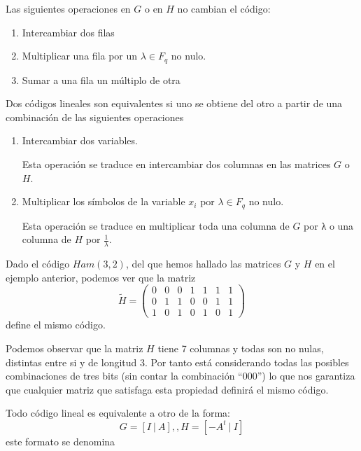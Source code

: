 \obs Las siguientes operaciones en $G$ o en $H$ no cambian el código:
\begin{enumerate}
\item Intercambiar dos filas
\item Multiplicar una fila por un $λ\in F_q$ no nulo.
\item Sumar a una fila un múltiplo de otra
\end{enumerate}

\begin{defn}
Dos códigos lineales son equivalentes si uno se obtiene del otro a partir de una combinación de las siguientes operaciones
\begin{enumerate}
\item Intercambiar dos variables.

Esta operación se traduce en intercambiar dos columnas en las matrices $G$ o $H$.

\item Multiplicar los símbolos de la variable $x_i$ por $λ \in F_q$ no nulo.

Esta operación se traduce en multiplicar toda una columna de $G$ por λ o una columna de $H$ por $\frac{1}{λ}$.
\end{enumerate}
\end{defn}

\begin{example}
Dado el código $Ham(3,2)$, del que hemos hallado las matrices $G$ y $H$ en el ejemplo anterior, podemos ver que la matriz
\[\tilde{H} = \left(\begin{array}{ccccccc}
0 & 0 & 0 & 1 & 1 & 1 & 1\\
0 & 1 & 1 & 0 & 0 & 1 & 1\\
1 & 0 & 1 & 0 & 1 & 0 & 1
\end{array} \right)\]
define el mismo código.
\end{example}

Podemos observar que la matriz $H$ tiene 7 columnas y todas son no nulas, distintas entre si y de longitud 3. Por tanto está considerando todas las posibles combinaciones de tres bits (sin contar la combinación ``000'') lo que nos garantiza que cualquier matriz que satisfaga esta propiedad definirá el mismo código.

\begin{prop}
Todo código lineal es equivalente a otro de la forma:
\[G=[I \ |\  A ], , H = [-A^t \ | \ I]\]
este formato se denomina 
\end{prop}

